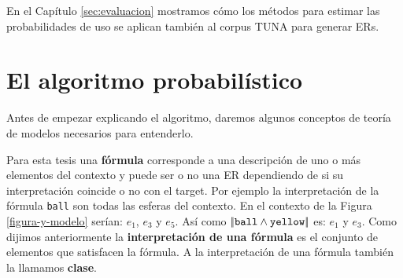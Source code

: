 En el Cap\'itulo \ref{sec:evaluacion} mostramos c\'omo los m\'etodos para estimar las probabilidades de uso se aplican tambi\'en al corpus TUNA para generar ERs.

\section{El algoritmo probabil\'istico}
\label{sec:algoritmo_probabilistico}
Antes de empezar explicando el algoritmo, daremos algunos conceptos de teor\'ia de modelos necesarios para entenderlo.

Para esta tesis una \textbf{f\'ormula} corresponde a una descripci\'on de uno o m\'as elementos del contexto y puede ser o no una ER dependiendo de 
si su interpretaci\'on coincide o no con el target. Por ejemplo la interpretaci\'on de la f\'ormula \texttt{ball} son todas las esferas 
del contexto. En el contexto de la Figura \ref{figura-y-modelo} ser\'ian: $e_1$, $e_3$ y $e_5$. As\'i como $|\!|\texttt{ball} \land \texttt{yellow}|\!|$ es: $e_1$ y $e_3$.
Como dijimos anteriormente la \textbf{interpretaci\'on de una f\'ormula} es el conjunto de elementos que satisfacen la f\'ormula. A la interpretaci\'on de una f\'ormula tambi\'en la llamamos \textbf{clase}.

